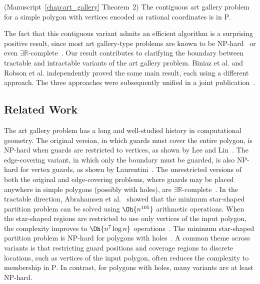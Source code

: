 \begin{theorem}(Manuscript~\ref{chap:art_gallery} Theorem~2) 
\label{thm:CAG_is_truly_in_P}
    The contiguous art gallery problem for a simple polygon with vertices encoded as rational coordinates is in \textsc{P}.
\end{theorem}

The fact that this contiguous variant admits an efficient algorithm is a surprising positive result, since most art gallery-type problems are known to be \textsc{NP}-hard~\cite{10.1145/800157.805047} or even $\exists \mathbb{R}$-complete~\cite{Schaefer2017, 10.1145/62212.62257, Matousek2014}. 
Our result contributes to clarifying the boundary between tractable and intractable variants of the art gallery problem. 
Biniaz et al.\cite{biniaz2025contiguousboundaryguarding} and Robson et al.\cite{robson2025analyticarccoverproblem} independently proved the same main result, each using a different approach. 
The three approaches were subsequently unified in a joint publication~\cite{biniaz_et_al:LIPIcs.SoCG.2025.20}. 

\subsection{Related Work}
The art gallery problem has a long and well-studied history in computational geometry. 
The original version, in which guards must cover the entire polygon, is \textsc{NP}-hard when guards are restricted to vertices, as shown by Lee and Lin~\cite{Lee1990}. 
The edge-covering variant, in which only the boundary must be guarded, is also \textsc{NP}-hard for vertex guards, as shown by Laurentini~\cite{Laurentini1999}. 
The unrestricted versions of both the original and edge-covering problems, where guards may be placed anywhere in simple polygons (possibly with holes), are $\exists\mathbb{R}$-complete~\cite{10.1145/3486220}. 
In the tractable direction, Abrahamsen et al.~\cite{10.1145/3618260.3649756} showed that the minimum star-shaped partition problem can be solved using $\Oh{n^{105}}$ arithmetic operations. 
When the star-shaped regions are restricted to use only vertices of the input polygon, the complexity improves to $\Oh{n^7 \log n}$ operations~\cite{doi:10.1137/0214056}. 
The minimum star-shaped partition problem is \textsc{NP}-hard for polygons with holes~\cite{10.5555/40599}. 
A common theme across variants is that restricting guard positions and coverage regions to discrete locations, such as vertices of the input polygon, often reduces the complexity to membership in \textsc{P}. 
In contrast, for polygons with holes, many variants are at least \textsc{NP}-hard. 

